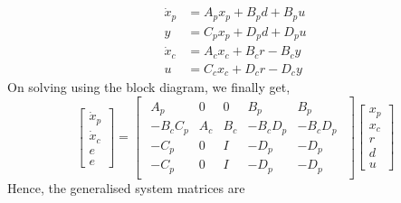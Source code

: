 \documentclass[a4paper,12pt]{article}
\begin{document}
				\begin{align}
				\dot{x}_{p}&=A_{p}x_{p}+B_{p}d+B_{p}u\\
				y&=C_{p}x_{p}+D_{p}d+D_{p}u\\
				\dot{x}_{c}&=A_{c}x_{c}+B_{c}r-B_{c}y\\
				u&=C_{c}x_{c}+D_{c}r-D_{c}y				
				\end{align}
				On solving using the block diagram, we finally get,
				\[
				\begin{bmatrix}
				\dot{x}_{p} \\
				\dot{x}_{c} \\
				\hline
				e \\
				\hline
				e
				\end{bmatrix}
				=
				\begin{bmatrix}
				\begin{array}{cc|cc|c}
				A_{p} & 0 & 0 & B_{p} & B_{p}\\
				-B_{c}C_{p} & A_{c} & B_{c} & -B_{c}D_{p} & -B_{c}D_{p}\\
				\hline
				-C_{p} & 0 & I & -D_{p} & -D_{p} \\
				\hline
				-C_{p} & 0 & I & -D_{p} & -D_{p} 
				\end{array}
				\end{bmatrix}
				\begin{bmatrix}
				x_{p} \\ x_{c} \\ \hline r \\ d \\ \hline u 
				\end{bmatrix}	
				\]
				Hence, the generalised system matrices are
				
\end{document}
